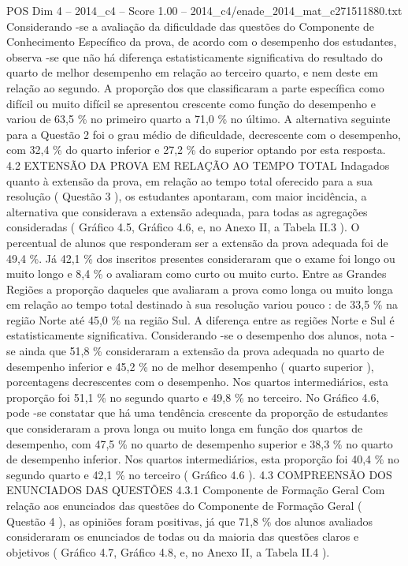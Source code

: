 \begin{textsample}{POS Dim 4 – 2014\_c4 – Score 1.00 – 2014\_c4/enade\_2014\_mat\_c271511880.txt}
Considerando -se a avaliação da dificuldade das questões do Componente de Conhecimento Específico da prova, de acordo com o desempenho dos estudantes, observa -se que não há diferença estatisticamente significativa do resultado do quarto de melhor desempenho em relação ao terceiro quarto, e nem deste em relação ao segundo.
A proporção dos que classificaram a parte específica como difícil ou muito difícil se apresentou crescente como função do desempenho e variou de 63,5 \% no primeiro quarto a 71,0 \% no último.
A alternativa seguinte para a Questão 2 foi o grau médio de dificuldade, decrescente com o desempenho, com 32,4 \% do quarto inferior e 27,2 \% do superior optando por esta resposta. 4.2 EXTENSÃO DA PROVA EM RELAÇÃO AO TEMPO TOTAL Indagados quanto à extensão da prova, em relação ao tempo total oferecido para a sua resolução ( Questão 3 ), os estudantes apontaram, com maior incidência, a alternativa que considerava a extensão adequada, para todas as agregações consideradas ( Gráfico 4.5, Gráfico 4.6, e, no Anexo II, a Tabela II.3 ).
O percentual de alunos que responderam ser a extensão da prova adequada foi de 49,4 \%.
Já 42,1 \% dos inscritos presentes consideraram que o exame foi longo ou muito longo e 8,4 \% o avaliaram como curto ou muito curto.
Entre as Grandes Regiões a proporção daqueles que avaliaram a prova como longa ou muito longa em relação ao tempo total destinado à sua resolução variou pouco : de 33,5 \% na região Norte até 45,0 \% na região Sul.
A diferença entre as regiões Norte e Sul é estatisticamente significativa.
Considerando -se o desempenho dos alunos, nota -se ainda que 51,8 \% consideraram a extensão da prova adequada no quarto de desempenho inferior e 45,2 \% no de melhor desempenho ( quarto superior ), porcentagens decrescentes com o desempenho.
Nos quartos intermediários, esta proporção foi 51,1 \% no segundo quarto e 49,8 \% no terceiro.
No Gráfico 4.6, pode -se constatar que há uma tendência crescente da proporção de estudantes que consideraram a prova longa ou muito longa em função dos quartos de desempenho, com 47,5 \% no quarto de desempenho superior e 38,3 \% no quarto de desempenho inferior.
Nos quartos intermediários, esta proporção foi 40,4 \% no segundo quarto e 42,1 \% no terceiro ( Gráfico 4.6 ). 4.3 COMPREENSÃO DOS ENUNCIADOS DAS QUESTÕES 4.3.1 Componente de Formação Geral Com relação aos enunciados das questões do Componente de Formação Geral ( Questão 4 ), as opiniões foram positivas, já que 71,8 \% dos alunos avaliados consideraram os enunciados de todas ou da maioria das questões claros e objetivos ( Gráfico 4.7, Gráfico 4.8, e, no Anexo II, a Tabela II.4 ).

\end{textsample}
